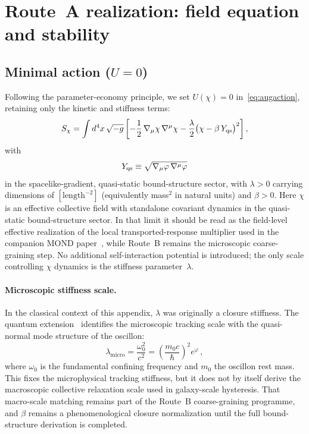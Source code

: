 \documentclass[11pt]{article}
\begin{document}
\section{Route~A realization: field equation and stability}\label{sec:routeA_real}

\subsection{Minimal action ($U = 0$)}\label{sec:minaction}
Following the parameter-economy principle, we set $U(\chi) = 0$
in~\eqref{eq:augaction}, retaining only the kinetic and
stiffness terms:
\begin{equation}
S_\chi = \int d^4x\,\sqrt{-g}\left[
  -\frac{1}{2}\,\nabla_\mu\chi\,\nabla^\mu\chi
  - \frac{\lambda}{2}\bigl(\chi - \beta\,Y_{\rm qs}\bigr)^2
\right],
\label{eq:Schi}
\end{equation}
with
\begin{equation}
Y_{\rm qs} \equiv \sqrt{\nabla_\mu\varphi\,\nabla^\mu\varphi}
\end{equation}
in the spacelike-gradient, quasi-static bound-structure sector,
with $\lambda > 0$ carrying dimensions of
$[\mathrm{length}^{-2}]$ (equivalently mass$^{2}$ in
natural units) and $\beta > 0$.
Here $\chi$ is an effective collective field with standalone covariant
dynamics in the quasi-static bound-structure sector. In that limit it
should be read as the field-level effective realization of the local
transported-response multiplier used in the companion MOND
paper~\cite{Lotishvili2026MOND}, while Route~B remains the microscopic
coarse-graining step.
No additional self-interaction potential is introduced;
the only scale controlling $\chi$ dynamics is the
stiffness parameter~$\lambda$.

\paragraph{Microscopic stiffness scale.}
In the classical context of this appendix, $\lambda$ was
originally a closure stiffness.  The quantum
extension~\cite{Lotishvili2026Q} identifies the microscopic tracking
scale with the quasi-normal mode structure of the oscillon:
\begin{equation}
  \lambda_{\mathrm{micro}}
  = \frac{\omega_0^2}{c^2}
  = \left(\frac{m_0 c}{\hbar}\right)^{\!2} e^{\varphi}\,,
  \label{eq:lambda_micro}
\end{equation}
where $\omega_0$ is the fundamental confining frequency
and $m_0$ the oscillon rest mass.  This fixes the
microphysical tracking stiffness, but it does not by itself derive the
macroscopic collective relaxation scale used in galaxy-scale
hysteresis.  That macro-scale matching remains part of the Route~B
coarse-graining programme, and $\beta$ remains a phenomenological
closure normalization until the full bound-structure derivation is
completed.
\end{document}
